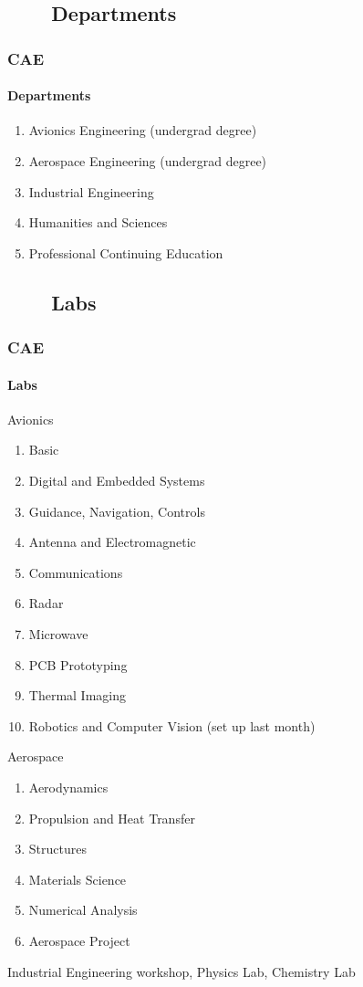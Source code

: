 \subsection{\ \ \ \ Departments}
\begin{frame}
\frametitle{CAE}
\framesubtitle{Departments}
\mypagenum{}
\begin{enumerate}
\item Avionics Engineering (undergrad degree)
\item Aerospace Engineering (undergrad degree)
\item Industrial Engineering
\item Humanities and Sciences
\item Professional Continuing Education
\end{enumerate}
\end{frame}


\subsection{\ \ \ \ Labs}
\begin{frame}
\frametitle{CAE}
\framesubtitle{Labs}
\mypagenum{}
\vspace{0.1in}
\scriptsize Avionics
\begin{enumerate}\scriptsize
\item Basic
\item Digital and Embedded Systems
\item Guidance, Navigation, Controls
\item Antenna and Electromagnetic
\item Communications
\item Radar
\item Microwave
\item PCB Prototyping
\item Thermal Imaging
\item Robotics and Computer Vision (set up last month)
\end{enumerate}
\scriptsize Aerospace
\begin{enumerate}\scriptsize
\item Aerodynamics
\item Propulsion and Heat Transfer
\item Structures
\item Materials Science
\item Numerical Analysis
\item Aerospace Project
\end{enumerate}
\scriptsize Industrial Engineering workshop, Physics Lab, Chemistry Lab
\end{frame}








